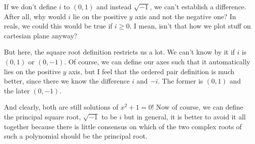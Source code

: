 If we don't define \(i\) to \((0,1)\) and instead \(\sqrt{-1}\), we can't
establish a difference. After all, why would \(i\) lie on the positive \(y\) axis
and not the negative one? In reals, we could this would be true if \(i \ge 0\). 
I mean, isn't that how we plot stuff on cartesian plane anyway? 

But here, the square root definition restricts us a lot. We can't know by it if
\(i\) is \((0,1)\) or \((0,-1)\). Of course, we can define our axes such that it
automatically lies on the positive \(y\) axis, but I feel that the ordered pair
definition is much better, since there we know the difference \(i\) and \(-i\). 
The former is \((0, 1)\) and the later \((0, -1)\). 

And clearly, both are still solutions of \(x^2 + 1 = 0\)! Now of course,
we can define the principal square root, \(\sqrt{-1}\) to be \(i\) but in general,
it is better to avoid it all together because there is little consensus on which of the
two complex roots of such a polynomial should be the principal root.